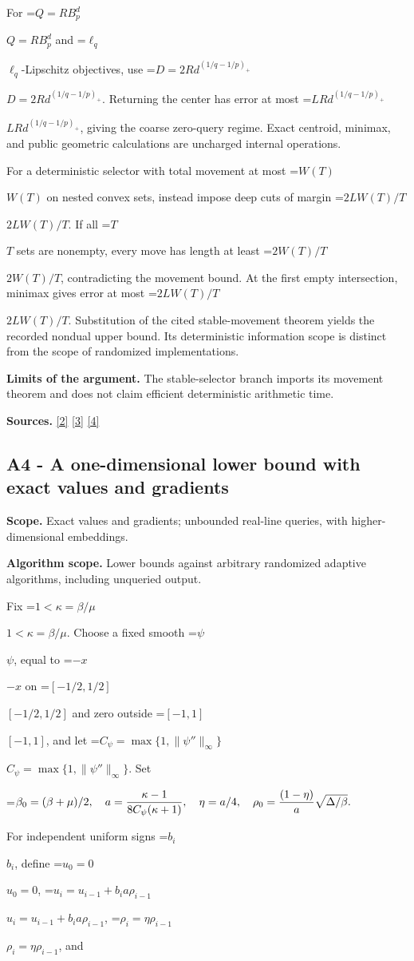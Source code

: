 \documentclass[10pt,a4paper]{article}
\newcommand{\AtlasMath}[1]{\par\begingroup\centering\setbox0=\hbox{$\displaystyle #1$}\ifdim\wd0>1.4\linewidth\typeout{ATLAS WIDE FORMULA: \the\wd0}\fi\ifdim\wd0>\linewidth\resizebox{\linewidth}{!}{\box0}\else\box0\fi\par\endgroup}
\newcommand{\AtlasInlineMath}[1]{\begingroup\setbox0=\hbox{$#1$}\ifdim\wd0>.4\linewidth\endgroup\AtlasMath{#1}\else\endgroup$#1$\fi}
\begin{document}
For \AtlasInlineMath{Q=RB_p^d} and \AtlasInlineMath{\ell_q}-Lipschitz objectives, use \AtlasInlineMath{D=2Rd^{(1/q-1/p)_+}}. Returning the center has error at most \AtlasInlineMath{LRd^{(1/q-1/p)_+}}, giving the coarse zero-query regime. Exact centroid, minimax, and public geometric calculations are uncharged internal operations.

For a deterministic selector with total movement at most \AtlasInlineMath{W(T)} on nested convex sets, instead impose deep cuts of margin \AtlasInlineMath{2LW(T)/T}. If all \AtlasInlineMath{T} sets are nonempty, every move has length at least \AtlasInlineMath{2W(T)/T}, contradicting the movement bound. At the first empty intersection, minimax gives error at most \AtlasInlineMath{2LW(T)/T}. Substitution of the cited stable-movement theorem yields the recorded nondual upper bound. Its deterministic information scope is distinct from the scope of randomized implementations.

\textbf{Limits of the argument.} The stable-selector branch imports its movement theorem and does not claim efficient deterministic arithmetic time.

\textbf{Sources.} \href{https://arxiv.org/pdf/1405.4980}{[2]} \href{https://www2.isye.gatech.edu/~nemirovs/MOR_AccuracyCertificates.pdf}{[3]} \href{https://arxiv.org/pdf/2609.20701}{[4]}

\subsection{A4 - A one-dimensional lower bound with exact values and gradients}
\textbf{Scope.} Exact values and gradients; unbounded real-line queries, with higher-dimensional embeddings.

\textbf{Algorithm scope.} Lower bounds against arbitrary randomized adaptive algorithms, including unqueried output.

Fix \AtlasInlineMath{1<\kappa=\beta/\mu}. Choose a fixed smooth \AtlasInlineMath{\psi}, equal to \AtlasInlineMath{-x} on \AtlasInlineMath{[-1/2,1/2]} and zero outside \AtlasInlineMath{[-1,1]}, and let \AtlasInlineMath{C_\psi=\max\{1,\|\psi''\|_\infty\}}. Set

\AtlasMath{\beta_0=(\beta+\mu)/2,\quad a={\kappa-1\over8C_\psi(\kappa+1)},\quad
\eta=a/4,\quad \rho_0={(1-\eta)\over a}\sqrt{\Delta/\beta}.}

For independent uniform signs \AtlasInlineMath{b_i}, define \AtlasInlineMath{u_0=0},
\AtlasInlineMath{u_i=u_{i-1}+b_i a\rho_{i-1}}, \AtlasInlineMath{\rho_i=\eta\rho_{i-1}}, and
\end{document}
